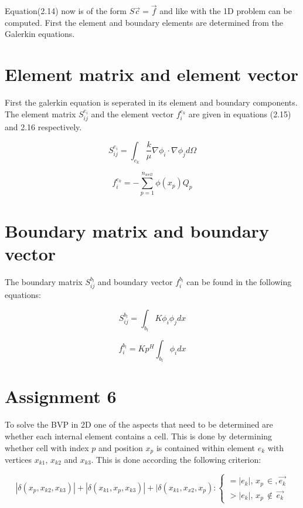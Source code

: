 \documentclass[a4paper]{report}
\begin{document}
Equation(2.14) now is of the form $S\vec{c}=\vec{f}$ and like with the 1D problem can be computed. First the element and boundary elements are determined from the Galerkin equations.


\section{Element matrix and element vector}

First the galerkin equation is seperated in its element and boundary components. The element matrix $S^{e_i}_{ij}$ and the element vector $f^{e_k}_i$ are given in equations (2.15) and 2.16 respectively.

\begin{equation}
	S^{e_i}_{ij} = \int_{e_k}\frac{k}{\mu}\nabla\phi_i\cdot\nabla \phi_j d\Omega
\end{equation}

\begin{equation}
	f^{e_k}_i =  -\sum_{p=1}^{n_{well}}\phi(x_p) Q_p
\end{equation}


\section{Boundary matrix and boundary vector}

The boundary matrix $S^{b_l}_{ij}$ and boundary vector $f^{b_l}_i$ can be found in the following equations:

\begin{equation}
	S^{b_l}_{ij} = \int_{b_l} K\phi_i \phi_j dx
\end{equation}

\begin{equation}
	f^{b_l}_i = Kp^H\int_{b_l}\phi_i dx
\end{equation}


\section{Assignment 6}

To solve the BVP in 2D one of the aspects that need to be determined are whether each internal element contains a cell. This is done by determining whether cell with index $p$ and position $x_p$ is contained within element $e_k$ with vertices $x_{k1}$, $x_{k2}$ and $x_{k3}$. This is done according the following criterion:

\begin{equation}
|\delta(x_p,x_{k2},x_{k3})|+|\delta(x_{k1},x_p,x_{k3})|+|\delta(x_{k1},x_{x2},x_p):
	\begin{cases} 
	=|e_k|,\, x_p\, \in, \vec{e_k}\\ 
	>|e_k|,\, x_p\, \notin\,\vec{e_k}
	\end{cases} 
\end{equation}
\end{document}
